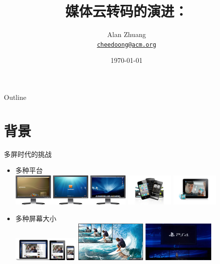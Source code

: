 \documentclass{beamer}
\title{媒体云转码的演进：\\\Small{MapReduce、DASH与稳定婚姻}}
\author{Alan Zhuang\\
\href{mailto:cheedoong@acm.org}{\nolinkurl{cheedoong@acm.org}}\\
}
\date{\today}
\begin{document}

\frame{\titlepage}

\section[Outline]{}
\begin{frame}{Outline}
\tableofcontents
\end{frame}

\section{背景}
\begin{frame}{多屏时代的挑战}
\begin{itemize}
\pause
\item 多种平台\\ \pause
\includegraphics[height=1.6cm]{fig/PCs.png}\hspace*{0.1cm}\pause
\includegraphics[height=1.6cm]{fig/mobile-bc.png}\hspace*{0.1cm}\pause
\includegraphics[height=1.6cm]{fig/streaming-bc.png}
\item 多种屏幕大小\\ \pause
\includegraphics[height=1.2cm]{fig/screen_sizes.jpg}\hspace*{0.1cm}\pause
\includegraphics[height=2cm]{fig/480_to_4KVideo.jpg}\hspace*{0.1cm}\pause
\includegraphics[height=2cm]{fig/4k_video.jpg}
\end{itemize}
\end{frame}
\end{document}

